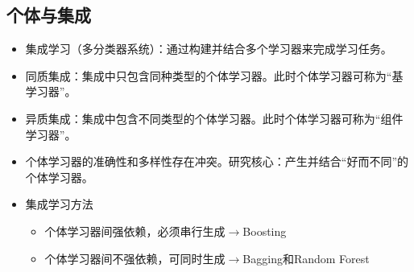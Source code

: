 \documentclass{ctexart}
\begin{document}
				\subsection{个体与集成}
					\begin{itemize}
						\item 集成学习（多分类器系统）：通过构建并结合多个学习器来完成学习任务。
						\item 同质集成：集成中只包含同种类型的个体学习器。此时个体学习器可称为``基学习器''。
						\item 异质集成：集成中包含不同类型的个体学习器。此时个体学习器可称为``组件学习器''。
						\item 个体学习器的准确性和多样性存在冲突。研究核心：产生并结合``好而不同''的个体学习器。
						\item 集成学习方法\begin{itemize}
							\item 个体学习器间强依赖，必须串行生成$\rightarrow$Boosting
							\item 个体学习器间不强依赖，可同时生成$\rightarrow$Bagging和Random Forest
						\end{itemize}
					\end{itemize}
\end{document}
